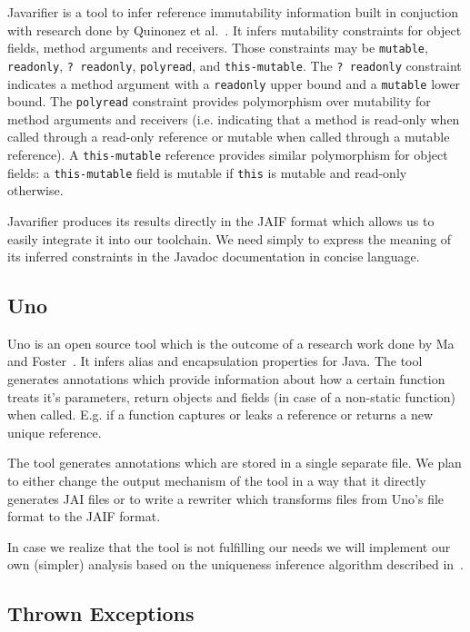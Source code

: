 Javarifier is a tool to infer reference immutability information built in
conjuction with research done by Quinonez et al.~\cite{Javarifier}. It infers
mutability constraints for object fields, method arguments and receivers. Those
constraints may be \texttt{mutable}, \texttt{readonly}, \texttt{?~readonly},
\texttt{polyread}, and \texttt{this-mutable}. The \texttt{?~readonly}
constraint indicates a method argument with a \texttt{readonly} upper bound and
a \texttt{mutable} lower bound. The \texttt{polyread} constraint provides
polymorphism over mutability for method arguments and receivers
(i.e. indicating that a method is read-only when called through a read-only
reference or mutable when called through a mutable reference). A
\texttt{this-mutable} reference provides similar polymorphism for object
fields: a \texttt{this-mutable} field is mutable if \texttt{this} is mutable
and read-only otherwise.

Javarifier produces its results directly in the JAIF format which allows us to
easily integrate it into our toolchain. We need simply to express the meaning
of its inferred constraints in the Javadoc documentation in concise language.

\subsection{Uno}

Uno is an open source tool which is the outcome of a research work done by
Ma and Foster~\cite{Uno}. It infers alias and encapsulation properties for Java.
The tool generates annotations which provide information about how a certain function
treats it's parameters, return objects and fields (in case of a non-static function) 
when called. E.g. if a function captures or leaks a reference or returns a new 
unique reference.

The tool generates annotations which are stored in a single separate file. We plan
to either change the output mechanism of the tool in a way that it directly generates
JAI files or to write a rewriter which transforms files from Uno's file format to the
JAIF format.

In case we realize that the tool is not fulfilling our needs we will implement
our own (simpler) analysis based on the uniqueness inference algorithm
described in~\cite{UniquenessInference}.

\subsection{Thrown Exceptions}

